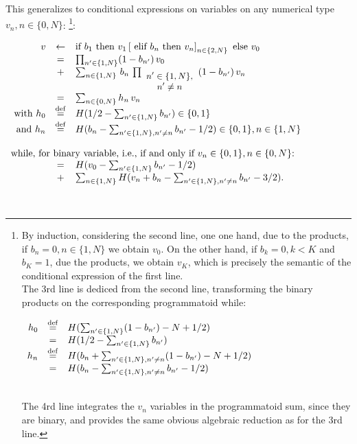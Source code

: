 \documentclass[a4]{article}
\newcommand{\eqline}[1]{~\vspace{0.1cm}\\\centerline{$#1$}\vspace{0.1cm}\\}
\newcommand{\defq}{\stackrel {\rm def}{=}}
\begin{document}
This generalizes to conditional expressions on variables on any numerical type $v_n, n \in \{0, N\}$: \footnote{
By induction, considering the second line, one one hand, due to the products, if $b_n = 0, n \in \{1, N\}$ we obtain $v_0$.
On the other hand, if $b_k = 0, k < K$ and $b_K = 1$, due the products, we obtain $v_K$, which is precisely the semantic
of the conditional expression of the first line. \\
The 3rd line is dediced from the second line, transforming the binary products on the corresponding programmatoid while:
\eqline{\begin{array}{rcl}
    h_0 &\defq& H(\sum_{n' \in \{1,  N\}} (1 - b_{n'}) - N + 1/2) \\ &=& H(1/2 - \sum_{n' \in \{1,  N\}} b_{n'})\\
    h_n &\defq& H(b_n + \sum_{n' \in \{1,  N\}, n' \ne n} (1 - b_{n'})  - N + 1/2) \\ &=& H(b_n - \sum_{n' \in \{1,  N\}, n' \ne n} b_{n'} - 1/2) \\
\end{array}}
The 4rd line integrates the $v_n$ variables in the programmatoid sum, since they are binary,
and provides the same obvious algebraic reduction as for the 3rd line.}: \eqline{\begin{array}{rcl}
v &\leftarrow& \mbox{if } b_1 \mbox{ then } v_1 \left[ \mbox{ elif } b_n \mbox{ then } v_n \right]_{n \in \{2, N\}} \mbox{ else } v_0 \\
    &=& \prod_{n' \in \{1,  N\}} (1 - b_{n'}) \, v_0  \\&+& \sum_{n \in \{1, N\}} \, b_n \, \prod_{\small \begin{array}{c}n' \in \{1,  N\}, \\ n' \ne n \\ \end{array}} (1 - b_{n'})  \, v_n  \\
   &=& \sum_{n \in \{0, N\}} h_n \, v_n \\
\mbox{ with } h_0 &\defq& H(1/2 - \sum_{n' \in \{1,  N\}} b_{n'})  \in \{0, 1\}\\
\mbox{ and } h_n &\defq&  H(b_n - \sum_{n' \in \{1,  N\}, n' \ne n} b_{n'} - 1/2) \in \{0, 1\}, n \in \{1, N\} \\
    &&\\ \multicolumn{3}{l}{\mbox{while, for binary variable, i.e., if and only if $v_n \in \{0, 1\},  n \in \{0, N\}$: }} \\
    &=& H(v_0 - \sum_{n' \in \{1,  N\}} b_{n'} - 1/2)  \\ &+& \sum_{n \in \{1, N\}} H(v_n + b_n - \sum_{n' \in \{1,  N\}, n' \ne n} b_{n'} - 3/2). \\
\end{array}}
\end{document}
